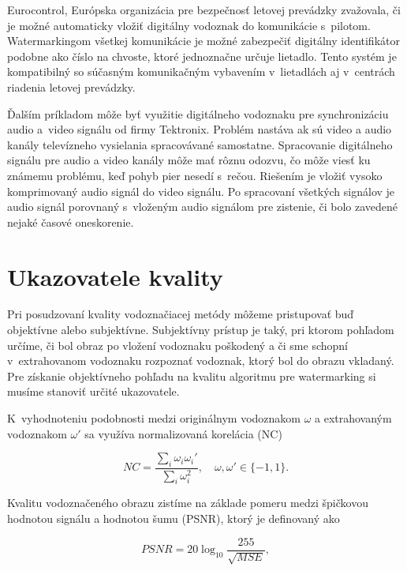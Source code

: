 Eurocontrol, Európska organizácia pre bezpečnosť letovej prevádzky zvažovala, či je možné automaticky vložiť digitálny vodoznak do komunikácie s~pilotom. Watermarkingom všetkej komunikácie je možné zabezpečiť digitálny identifikátor podobne ako číslo na chvoste, ktoré jednoznačne určuje lietadlo. Tento systém je kompatibilný so súčasným komunikačným vybavením v~lietadlách aj v~centrách riadenia letovej prevádzky.

Ďalším príkladom môže byť využitie digitálneho vodoznaku pre synchronizáciu audio a~video signálu od firmy Tektronix. Problém nastáva ak sú video a audio kanály televízneho vysielania spracovávané samostatne. Spracovanie digitálneho signálu pre audio a video kanály môže mať rôznu odozvu, čo môže viesť ku známemu problému, keď pohyb pier nesedí s~rečou. Riešením je vložiť vysoko komprimovaný audio signál do video signálu. Po spracovaní všetkých signálov je audio signál porovnaný s~vloženým audio signálom pre zistenie, či bolo zavedené nejaké časové oneskorenie. \cite{Cox}


\section{Ukazovatele kvality}
Pri posudzovaní kvality vodoznačiacej metódy môžeme pristupovať buď objektívne alebo subjektívne. Subjektívny prístup je taký, pri ktorom pohľadom určíme, či bol obraz po vložení vodoznaku poškodený a či sme schopní v~extrahovanom vodoznaku rozpoznať vodoznak, ktorý bol do obrazu vkladaný.
Pre získanie objektívneho pohľadu na kvalitu algoritmu pre watermarking si musíme stanoviť určité ukazovatele.

K~vyhodnoteniu podobnosti medzi originálnym vodoznakom $\omega$ a extrahovaným vodoznakom $\omega'$ sa využíva normalizovaná korelácia (NC) \cite{QRdecomposition}

\begin{equation}
NC = \frac{\sum_i \omega_i \omega_i'}{\sum_i \omega_i^2},\quad \omega,\omega'\in \{-1,1\}.
\end{equation}

Kvalitu vodoznačeného obrazu zistíme na základe pomeru medzi špičkovou hodnotou signálu a hodnotou šumu (PSNR), ktorý je definovaný ako

\begin{equation}
PSNR = 20\log_{10} \frac{255}{\sqrt{MSE}},
\end{equation}

